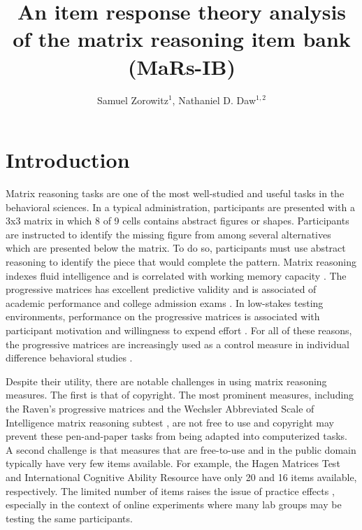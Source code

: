\documentclass[a4paper,man,natbib]{apa6}
\title{An item response theory analysis of the matrix reasoning item bank (MaRs-IB)}
\author{Samuel Zorowitz$^1$, Nathaniel D. Daw$^{1,2}$}
\affiliation{$^1$Princeton Neuroscience Institute, Princeton University, USA\\$^2$Department of Psychology, Princeton University, USA}
\begin{document}
\maketitle

\section{Introduction}

Matrix reasoning tasks are one of the most well-studied and useful tasks in the behavioral sciences. In a typical administration, participants are presented with a 3x3 matrix in which 8 of 9 cells contains abstract figures or shapes. Participants are instructed to identify the missing figure from among several alternatives which are presented below the matrix. To do so, participants must use abstract reasoning to identify the piece that would complete the pattern. Matrix reasoning indexes fluid intelligence and is correlated with working memory capacity \citep{conway2002latent, kane2004generality, unsworth2005working, salthouse2014relations}. The progressive matrices has excellent predictive validity and is associated of academic performance \citep{roth2015intelligence} and college admission exams \citep{frey2004scholastic, koenig2008act}. In low-stakes testing environments, performance on the progressive matrices is associated with participant motivation and willingness to expend effort \citep{gignac2018moderate, gignac2019maximum}. For all of these reasons, the progressive matrices are increasingly used as a control measure in individual difference behavioral studies \citep{gillan2016characterizing, rouault2018psychiatric, moutoussis2021decision}. 

Despite their utility, there are notable challenges in using matrix reasoning measures. The first is that of copyright. The most prominent measures, including the Raven's progressive matrices \citep{raven2003raven} and the Wechsler Abbreviated Scale of Intelligence matrix reasoning subtest \citep{wechsler1999wechsler}, are not free to use and copyright may prevent these pen-and-paper tasks from being adapted into computerized tasks. A second challenge is that measures that are free-to-use and in the public domain typically have very few items available. For example, the Hagen Matrices Test \citep{heydasch2014hagen} and International Cognitive Ability Resource \citep{condon2014international} have only 20 and 16 items available, respectively. The limited number of items raises the issue of practice effects \citep{ng1974applicability, bors2003effect}, especially in the context of online experiments where many lab groups may be testing the same participants. 
\end{document}
